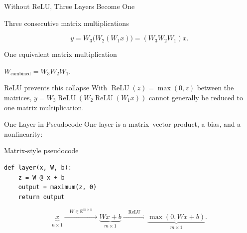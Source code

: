 \documentclass[aspectratio=169]{beamer}
\begin{document}
\begin{frame}{Without ReLU, Three Layers Become One}
  \small
  \begin{block}{Three consecutive matrix multiplications}
    \centering

    \vspace{-0.3em}
    \begin{equation*}
      y = W_3\bigl(W_2(W_1x)\bigr) = (W_3W_2W_1)x.
    \end{equation*}
  \end{block}
  \vspace{-0.3em}

  \begin{block}{One equivalent matrix multiplication}
    \centering
    \qquad
    $W_{\text{combined}} = W_3W_2W_1$.
  \end{block}
  \vspace{-0.3em}

  \begin{alertblock}{ReLU prevents this collapse}
    With $\operatorname{ReLU}(z)=\max(0,z)$ between the matrices,
    $y=W_3\operatorname{ReLU}(W_2\operatorname{ReLU}(W_1x))$ cannot generally
    be reduced to one matrix multiplication.
  \end{alertblock}
\end{frame}

\begin{frame}[fragile]{One Layer in Pseudocode}
  \small
  One layer is a matrix--vector product, a bias, and a nonlinearity:

  \begin{block}{Matrix-style pseudocode}
\begin{verbatim}
def layer(x, W, b):
    z = W @ x + b
    output = maximum(z, 0)
    return output
\end{verbatim}
  \end{block}

  \begin{equation*}
    \underbrace{x}_{n\times 1}
    \xrightarrow{\quad W\in\mathbb{R}^{m\times n}\quad}
    \underbrace{Wx+b}_{m\times 1}
    \xrightarrow{\quad \operatorname{ReLU}\quad}
    \underbrace{\max(0,Wx+b)}_{m\times 1}.
  \end{equation*}
\end{frame}
\end{document}
